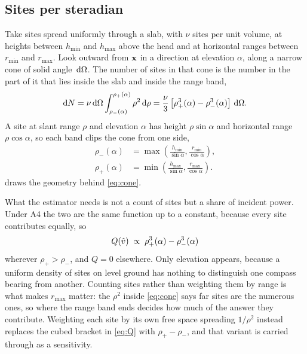 \subsection{Sites per steradian}

Take sites spread uniformly through a slab, with $\nu$ sites per unit volume, at
heights between $h_{\min}$ and $h_{\max}$ above the head and at horizontal
ranges between $r_{\min}$ and $r_{\max}$. Look outward from $\mathbf{x}$ in a direction
at elevation $\alpha$, along a narrow cone of solid angle $\,\mathrm{d}\Omega$. The number
of sites in that cone is the number in the part of it that lies inside the slab
and inside the range band,
\begin{equation}
  \mathrm{d}N = \nu \,\mathrm{d}\Omega \int_{\rho_-(\alpha)}^{\rho_+(\alpha)} \rho^2 \,
  \mathrm{d}\rho
  = \frac{\nu}{3} \left[ \rho_+^3(\alpha) - \rho_-^3(\alpha) \right] \,\mathrm{d}\Omega .
  \label{eq:cone}
\end{equation}
A site at slant range $\rho$ and elevation $\alpha$ has height $\rho \sin\alpha$
and horizontal range $\rho \cos\alpha$, so each band clips the cone from one
side,
\begin{align}
  \rho_-(\alpha) &= \max\!\left( \frac{h_{\min}}{\sin\alpha},
  \frac{r_{\min}}{\cos\alpha} \right), \nonumber \\
  \rho_+(\alpha) &= \min\!\left( \frac{h_{\max}}{\sin\alpha},
  \frac{r_{\max}}{\cos\alpha} \right).
  \label{eq:caps}
\end{align}
 draws the geometry behind \eqref{eq:cone}.

What the estimator needs is not a count of sites but a share of incident power.
Under A4 the two are the same function up to a constant, because every site
contributes equally, so
\begin{equation}
  Q(\hat{v}) \;\propto\; \rho_+^3(\alpha) - \rho_-^3(\alpha)
  \label{eq:Q}
\end{equation}
wherever $\rho_+ > \rho_-$, and $Q = 0$ elsewhere. Only elevation appears,
because a uniform density of sites on level ground has nothing to distinguish one
compass bearing from another. Counting sites rather than weighting them by range
is what makes $r_{\max}$ matter: the $\rho^2$ inside \eqref{eq:cone} says
far sites are the numerous ones, so where the range band ends decides how much of
the answer they contribute. Weighting each site by its own free space spreading
$1/\rho^2$ instead replaces the cubed bracket in \eqref{eq:Q} with
$\rho_+ - \rho_-$, and that variant is carried through as a sensitivity.

